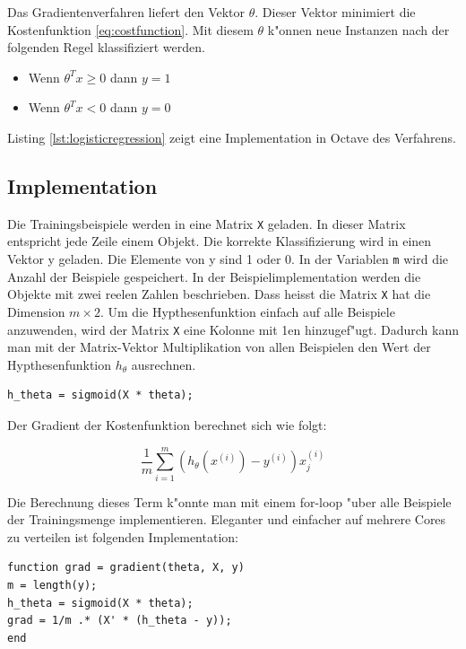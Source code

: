 \documentclass[12pt,a4paper,twoside]{article}
\begin{document}
Das Gradientenverfahren liefert den Vektor $\theta$. Dieser Vektor minimiert die Kostenfunktion \ref{eq:costfunction}. Mit diesem $\theta$ k"onnen neue Instanzen nach der folgenden Regel klassifiziert werden.
\begin{itemize}
\item Wenn $\theta^T x \geq 0$ dann $y=1$
\item Wenn $\theta^T x < 0$ dann $y=0$
\end{itemize}

Listing \ref{lst:logisticregression} zeigt eine Implementation in Octave des Verfahrens.

\subsection{Implementation}
\label{sec:implementation}
Die Trainingsbeispiele werden in eine Matrix \verb|X| geladen. In dieser Matrix entspricht jede Zeile einem Objekt. Die korrekte Klassifizierung wird in einen Vektor y geladen. Die Elemente von y sind 1 oder 0. In der Variablen \verb|m| wird die Anzahl der Beispiele gespeichert. In der Beispielimplementation werden die Objekte mit zwei reelen Zahlen beschrieben. Dass heisst die Matrix \verb|X| hat die Dimension $m \times 2$. Um die Hypthesenfunktion einfach auf alle Beispiele anzuwenden, wird der Matrix \verb|X| eine Kolonne mit 1en hinzugef"ugt. Dadurch kann man mit der Matrix-Vektor Multiplikation von allen Beispielen den Wert der Hypthesenfunktion $h_{\theta}$ ausrechnen.

\begin{lstlisting}
h_theta = sigmoid(X * theta);
\end{lstlisting}

Der Gradient der Kostenfunktion berechnet sich wie folgt:

\begin{equation}
\frac{1}{m} \sum_{i=1}^m (h_{\theta} (x^{(i)}) - y^{(i)})x_j^{(i)}  
\end{equation}

Die Berechnung dieses Term k"onnte man mit einem for-loop "uber alle Beispiele der Trainingsmenge implementieren. Eleganter und einfacher auf mehrere Cores zu verteilen ist folgenden Implementation:

\begin{lstlisting}
function grad = gradient(theta, X, y)
m = length(y);
h_theta = sigmoid(X * theta);
grad = 1/m .* (X' * (h_theta - y));
end
\end{lstlisting}
\end{document}
